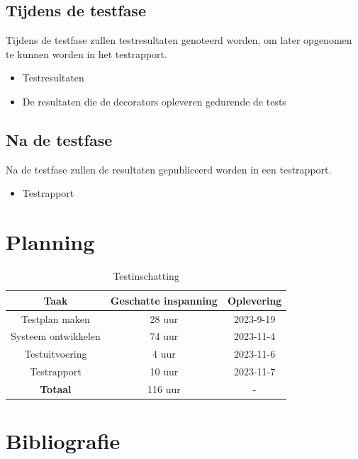 \documentclass[a4paper]{report}
\begin{document}
\section{Tijdens de testfase}
Tijdens de testfase zullen testresultaten genoteerd worden, om later opgenomen te kunnen worden in het testrapport. 
\begin{itemize}
  \item Testresultaten
  \item De resultaten die de decorators opleveren gedurende de tests
\end{itemize}
\section{Na de testfase}
Na de testfase zullen de resultaten gepubliceerd worden in een testrapport. 
\begin{itemize}
    \item Testrapport
\end{itemize}

\chapter{Planning}
\begin{table}[h]
  \centering
  \begin{tabular}{|c|c|c|}
    \hline
    \textbf{Taak} & \textbf{Geschatte inspanning} & \textbf{Oplevering} \\
    \hline
    Testplan maken  & 28 uur & 2023-9-19\\
    \hline
    Systeem ontwikkelen & 74 uur & 2023-11-4 \\
    \hline
    Testuitvoering  & 4 uur & 2023-11-6 \\
    \hline
    Testrapport & 10 uur & 2023-11-7 \\
    \hline
    \textbf{Totaal} &  116 uur & - \\
    \hline
  \end{tabular}
  \caption{Testinschatting}
\end{table}





\chapter{Bibliografie}
\nocite{*} %
\begingroup
\renewcommand{\chapter}[2]{} %
\renewcommand{\addcontentsline}[3]{} %


\endgroup
\end{document}
